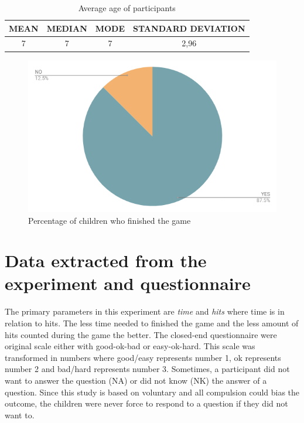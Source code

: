 

\renewcommand{\arraystretch}{1.5}

\begin{table}[!ht]
    \centering
    \begin{tabular}{c|c|c|c}
    \hline
        \multicolumn{1}{|c|}{MEAN} &
        \multicolumn{1}{c|}{MEDIAN} &
        \multicolumn{1}{c|}{MODE} &
        \multicolumn{1}{c|}{STANDARD DEVIATION}\\ \hline
       \multicolumn{1}{|c|}{7} &
        \multicolumn{1}{c|}{7} &
        \multicolumn{1}{c|}{7} &
        \multicolumn{1}{c|}{2,96} \\ \hline
    \end{tabular}
    \caption{Average age of participants}
    \label{tab:agestatistic}
\end{table}



\begin{figure}[!ht]
   \centering
    \includegraphics[width=.4\textwidth]{figures/finishedgame.png}
    \caption{Percentage of children who finished the game}
    \label{fig:finishedgame}
\end{figure}

\newpage


\section{Data extracted from the experiment and questionnaire}
The primary parameters in this experiment are \textit{time} and \textit{hits} where time is in relation to hits. The less time needed to finished the game and the less amount of hits counted during the game the better.
The closed-end questionnaire were original scale either with good-ok-bad or easy-ok-hard. This scale was transformed in numbers where good/easy represents number 1, ok represents number 2 and bad/hard represents number 3.
Sometimes, a participant did not want to answer the question (NA) or did not know (NK) the answer of a question. Since this study is based on voluntary and all compulsion could bias the outcome, the children were never force to respond to a question if they did not want to.

